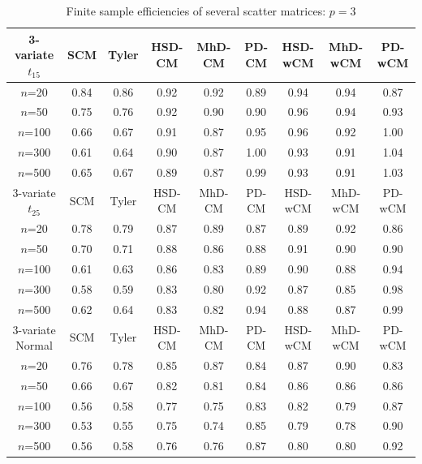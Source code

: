 \begin{table}[b]
\begin{footnotesize}
\begin{tabular}{c|cc|ccc|ccc}
    3-variate $t_{15}$ & SCM  & Tyler & HSD-CM & MhD-CM & PD-CM & HSD-wCM & MhD-wCM & PD-wCM \\ \hline
    $n$=20             & 0.84 & 0.86  & 0.92   & 0.92   & 0.89  & 0.94    & 0.94    & 0.87   \\
    $n$=50             & 0.75 & 0.76  & 0.92   & 0.90   & 0.90  & 0.96    & 0.94    & 0.93   \\
    $n$=100            & 0.66 & 0.67  & 0.91   & 0.87   & 0.95  & 0.96    & 0.92    & 1.00   \\
    $n$=300            & 0.61 & 0.64  & 0.90   & 0.87   & 1.00  & 0.93    & 0.91    & 1.04   \\
    $n$=500            & 0.65 & 0.67  & 0.89   & 0.87   & 0.99  & 0.93    & 0.91    & 1.03   \\ \hline
    3-variate $t_{25}$ & SCM  & Tyler & HSD-CM & MhD-CM & PD-CM & HSD-wCM & MhD-wCM & PD-wCM \\ \hline
    $n$=20             & 0.78 & 0.79  & 0.87   & 0.89   & 0.87  & 0.89    & 0.92    & 0.86   \\
    $n$=50             & 0.70 & 0.71  & 0.88   & 0.86   & 0.88  & 0.91    & 0.90    & 0.90   \\
    $n$=100            & 0.61 & 0.63  & 0.86   & 0.83   & 0.89  & 0.90    & 0.88    & 0.94   \\
    $n$=300            & 0.58 & 0.59  & 0.83   & 0.80   & 0.92  & 0.87    & 0.85    & 0.98   \\
    $n$=500            & 0.62 & 0.64  & 0.83   & 0.82   & 0.94  & 0.88    & 0.87    & 0.99   \\ \hline
    3-variate Normal   & SCM  & Tyler & HSD-CM & MhD-CM & PD-CM & HSD-wCM & MhD-wCM & PD-wCM \\ \hline
    $n$=20             & 0.76 & 0.78  & 0.85   & 0.87   & 0.84  & 0.87    & 0.90    & 0.83   \\
    $n$=50             & 0.66 & 0.67  & 0.82   & 0.81   & 0.84  & 0.86    & 0.86    & 0.86   \\
    $n$=100            & 0.56 & 0.58  & 0.77   & 0.75   & 0.83  & 0.82    & 0.79    & 0.87   \\
    $n$=300            & 0.53 & 0.55  & 0.75   & 0.74   & 0.85  & 0.79    & 0.78    & 0.90   \\
    $n$=500            & 0.56 & 0.58  & 0.76   & 0.76   & 0.87  & 0.80    & 0.80    & 0.92   \\ \hline
    \end{tabular}
\end{footnotesize}
\caption{Finite sample efficiencies of several scatter matrices: $p=3$}
\label{table:FSEtable3}
\end{table}

